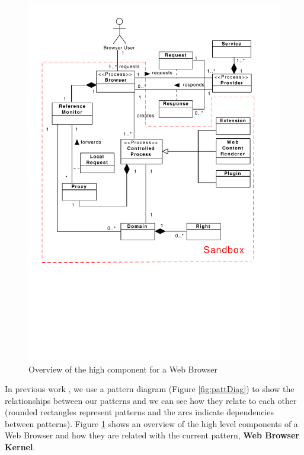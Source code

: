 \documentclass[prodmode,hillsideplop]{acmlarge}
\begin{document}
\begin{figure}[h!t]
    \vspace*{-0.5cm}
    \centering
    \hspace{0.5cm}
    \includegraphics[scale=0.52]{imgs/WBC.pdf}
    \vspace*{-3.5cm}
    \caption{Overview of the high component for a Web Browser}
    \label{fig:BInfra}
\end{figure}
 In previous work \cite{silva2015,silva2016a}, we use a pattern diagram \cite{Fernandez2008} (Figure \ref{fig:pattDiag}) to show the relationships between our patterns and we can see how they relate to each other (rounded rectangles represent patterns and the arcs indicate dependencies between patterns). Figure \ref{fig:BInfra} \cite{silva2015} shows an overview of the high level components of a Web Browser and how they are related with the current pattern, \textbf{Web Browser Kernel}.
\end{document}
